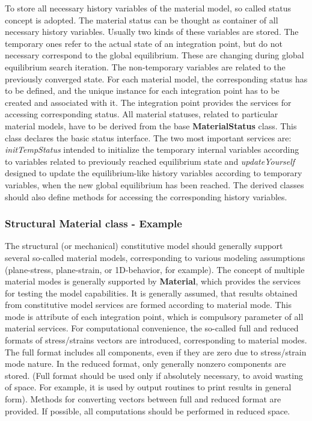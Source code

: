 \documentclass[a4paper]{article}
\newcommand{\class}[1]{{\bf #1}}
\newcommand{\service}[1]{{\em #1}}
\begin{document}
To store all necessary history variables of the material model, so called
status concept is adopted. The material status can be thought as 
container of all necessary history variables. Usually two kinds of
these variables are stored. The temporary ones refer to the actual
state of an integration point, but do not necessary correspond to
the global equilibrium. These are changing during global equilibrium search
iteration. The non-temporary variables are related to the 
previously converged state. 
For each material model, the corresponding status has to be defined,
and the unique instance for each integration point has to be created
and associated with it. The integration point provides the services for
accessing corresponding status. 
All material statuses, related to particular material models, have
to be derived from the base \class{MaterialStatus} class. This class
declares the basic status interface. The two most important services
are: \service{initTempStatus} intended to initialize the temporary
internal variables according to variables related to previously reached
equilibrium state and \service{updateYourself} designed to update the 
equilibrium-like history variables according to temporary variables,
when the new global equilibrium has been reached. The derived classes
should also define methods for accessing the corresponding history
variables.


 \subsubsection{Structural Material class - Example}
 The structural (or mechanical) constitutive model should generally
 support several so-called material models, corresponding to various
 modeling assumptions (plane-stress, plane-strain, or 1D-behavior,
 for example). The concept of multiple material modes is generally
 supported by \class{Material}, which provides the services for testing
 the model capabilities. It is generally assumed, that results obtained 
 from constitutive model services are formed according to 
 material mode. This mode is attribute of each integration point, 
 which is compulsory parameter of all material  services. For
 computational convenience, the so-called full and reduced formats of 
 stress/strains vectors are introduced, corresponding to material
 modes.
 The full format includes all components, even if they are zero due to stress/strain mode nature.
 In the reduced format, only generally nonzero components are stored.
 (Full format should be used only if absolutely necessary, to avoid
 wasting of space. For example, it is used 
 by output routines to print results in general form). Methods for converting vectors between 
 full and reduced format are provided. If possible, all computations 
 should be performed in reduced space.
\end{document}
